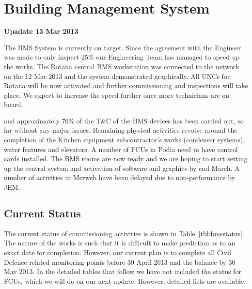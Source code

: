 \chapter{Building Management System}
\label{bms}

\begin{update}
\centerline{\textbf{Upadate 13 Mar 2013}}

The BMS System is currently on target. Since the agreement with the Engineer was made to only
inspect 25\% our Engineering Team has managed to speed up the works. The Rotana central
BMS workstation was connected to the network on the 12 Mar 2013 and the system demonstrated
graphically. All UNCs for Rotana will be now activated and further commissioning and inspections will
take place. We expect to increase the speed further once more technicians are on board.
\end{update}

 and approximately 76\% of the T\&C of the \ac{BMS} devices has been carried out, so far without any major issues. Remaining physical activities revolve around the
completion of the Kitchen equipment subcontractor's works (condenser systems), water features and elevators. A number of \acp{FCU} in Podia need to have control cards installed. The BMS rooms are now ready and we are hoping to start setting up the central system and activation of software and graphics by end March. A number of activities in Merweb have been delayed due to non-performance by JEM.

\section{Current Status}

The current status of commissioning activities is shown in
Table~\ref{tbl:bmsstatus}. The nature of the works is such
that it is difficult to make prediction as to an exact date
for completion. However, our current plan is to complete all Civil Defence related monitoring points before 30 April 2013 and the balance by 30 May 2013. In the detailed tables that follow we have not included the status for FCUs, which we will do on our next update. However, detailed lists are available.


